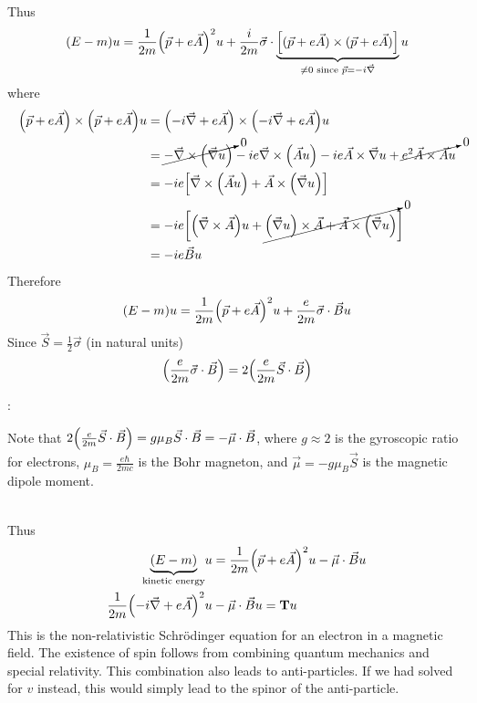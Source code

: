 \documentclass[12pt,a4paper,titlepage]{article}
\newcommand{\trm}[1]{\textrm{#1}} %
\newcommand{\ul}[1]{\underline{\smash{#1}}} %
\newcommand{\aside}[1]{%
	\ul{Aside}:\hfill
	\begin{minipage}[t]{\dimexpr\linewidth-8em\relax}
	#1
	\end{minipage}\hspace{4em}\bigskip
}
\begin{document}
Thus
\begin{equation}
(E-m)u=\frac{1}{2m}\qty(\vec{p}+e\vec{A})^{2}u+\frac{i}{2m}\vec{\sigma}\cdot\underbrace{\qty[(\vec{p}+e\vec{A})\times(\vec{p}+e\vec{A})]}_{\neq0 \trm{ since }\vec{p}=-i\vec{\nabla}}u
\end{equation}
where
\begin{equation}
\begin{aligned}
\qty(\vec{p}+e\vec{A})\times\qty(\vec{p}+e\vec{A})u&=\qty(-i\vec{\nabla}+e\vec{A})\times\qty(-i\vec{\nabla}+e\vec{A})u\\
&=\cancelto{0}{-\vec{\nabla}\times\qty(\vec{\nabla}u)}-ie\vec{\nabla}\times\qty(\vec{A}u)-ie\vec{A}\times\vec{\nabla}u+\cancelto{0}{e^{2}\vec{A}\times\vec{A}u}\\
&=-ie\qty[\vec{\nabla}\times\qty(\vec{A}u)+\vec{A}\times\qty(\vec{\nabla}u)]\\
&=-ie\bigg[\qty(\vec{\nabla}\times\vec{A})u+\cancelto{0}{\qty(\vec{\nabla}u)\times\vec{A}+\vec{A}\times\qty(\vec{\nabla}u)}\bigg]\\
&=-ie\vec{B}u
\end{aligned}
\end{equation}
Therefore
\begin{equation}
(E-m)u=\frac{1}{2m}\qty(\vec{p}+e\vec{A})^{2}u+\frac{e}{2m}\vec{\sigma}\cdot\vec{B}u
\end{equation}
Since $\vec{S}=\frac{1}{2}\vec{\sigma}$ (in natural units)
\begin{equation}
\qty(\frac{e}{2m}\vec{\sigma}\cdot\vec{B})=2\qty(\frac{e}{2m}\vec{S}\cdot\vec{B})
\end{equation}

\aside{Note that $2\qty(\frac{e}{2m}\vec{S}\cdot\vec{B})=g\mu_{B}\vec{S}\cdot\vec{B}=-\vec{\mu}\cdot\vec{B}$, where $g\approx 2$ is the gyroscopic ratio for electrons, $\mu_{B}=\frac{e\hbar}{2mc}$ is the Bohr magneton, and $\vec{\mu}=-g\mu_{B}\vec{S}$ is the magnetic dipole moment.}\\
Thus
\begin{equation}
\begin{aligned}
\underbrace{(E-m)}_{\trm{kinetic energy}}&u=\frac{1}{2m}\qty(\vec{p}+e\vec{A})^{2}u-\vec{\mu}\cdot\vec{B}u\\
\frac{1}{2m}\qty(-i\vec{\nabla}+e\vec{A})^{2}&u-\vec{\mu}\cdot\vec{B}u=\vb{T}u
\end{aligned}
\end{equation}
This is the non-relativistic Schr\"{o}dinger equation for an electron in a magnetic field. The existence of spin follows from combining quantum mechanics and special relativity. This combination also leads to anti-particles. If we had solved for $v$ instead, this would simply lead to the spinor of the anti-particle.\\
\end{document}
